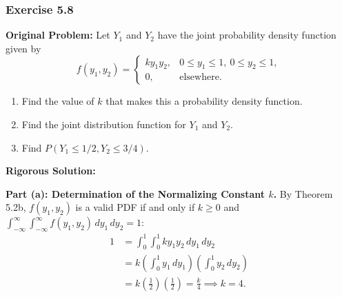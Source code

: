 \documentclass[11pt, letterpaper]{article}
\theoremstyle{definition}
\theoremstyle{remark}
\begin{document}
\bigskip

\subsubsection*{Exercise 5.8}
\textbf{Original Problem:} Let $Y_1$ and $Y_2$ have the joint probability density function given by
\[
    f(y_1, y_2) = \begin{cases}
        k y_1 y_2, & 0 \le y_1 \le 1,\ 0 \le y_2 \le 1, \\
        0, & \text{elsewhere.}
    \end{cases}
\]
\begin{enumerate}[label=\textbf{\alph*}]
    \item Find the value of $k$ that makes this a probability density function.
    \item Find the joint distribution function for $Y_1$ and $Y_2$.
    \item Find $P(Y_1 \le 1/2, Y_2 \le 3/4)$.
\end{enumerate}

\textbf{Rigorous Solution:}

\textbf{Part (a): Determination of the Normalizing Constant $k$.}
By Theorem 5.2b, $f(y_1, y_2)$ is a valid PDF if and only if $k \ge 0$ and $\int_{-\infty}^\infty \int_{-\infty}^\infty f(y_1, y_2) \, dy_1 \, dy_2 = 1$:
\begin{align*}
    1 &= \int_{0}^{1} \int_{0}^{1} k y_1 y_2 \, dy_1 \, dy_2 \\
    &= k \left( \int_{0}^{1} y_1 \, dy_1 \right) \left( \int_{0}^{1} y_2 \, dy_2 \right) \\
    &= k \left( \frac{1}{2} \right) \left( \frac{1}{2} \right) = \frac{k}{4} \implies k = 4.
\end{align*}
\end{document}
